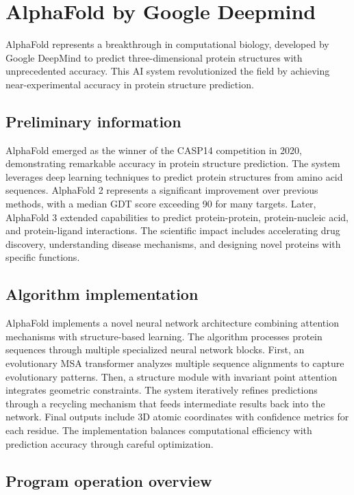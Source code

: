 \section{AlphaFold by Google Deepmind}

AlphaFold represents a breakthrough in computational biology, developed by Google DeepMind to predict three-dimensional protein structures with unprecedented accuracy.
This AI system revolutionized the field by achieving near-experimental accuracy in protein structure prediction.

\subsection{Preliminary information}

AlphaFold emerged as the winner of the CASP14 competition in 2020, demonstrating remarkable accuracy in protein structure prediction.
The system leverages deep learning techniques to predict protein structures from amino acid sequences.
AlphaFold 2 represents a significant improvement over previous methods, with a median GDT score exceeding 90 for many targets.
Later, AlphaFold 3 extended capabilities to predict protein-protein, protein-nucleic acid, and protein-ligand interactions.
The scientific impact includes accelerating drug discovery, understanding disease mechanisms, and designing novel proteins with specific functions.

\subsection{Algorithm implementation}

AlphaFold implements a novel neural network architecture combining attention mechanisms with structure-based learning.
The algorithm processes protein sequences through multiple specialized neural network blocks.
First, an evolutionary MSA transformer analyzes multiple sequence alignments to capture evolutionary patterns.
Then, a structure module with invariant point attention integrates geometric constraints.
The system iteratively refines predictions through a recycling mechanism that feeds intermediate results back into the network.
Final outputs include 3D atomic coordinates with confidence metrics for each residue.
The implementation balances computational efficiency with prediction accuracy through careful optimization.

\subsection{Program operation overview}

